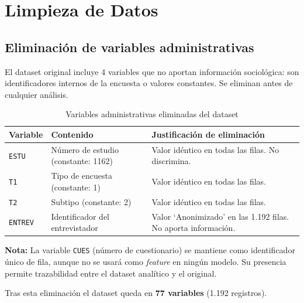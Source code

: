 \documentclass[12pt,a4paper]{article}
\newcommand{\thead}[1]{\cellcolor{tableheader}\color{white}\textbf{#1}}
\begin{document}
\newpage

\section{Limpieza de Datos}

\subsection{Eliminación de variables administrativas}

El dataset original incluye 4 variables que no aportan información sociológica: son identificadores internos de la encuesta o valores constantes. Se eliminan antes de cualquier análisis.

\begin{table}[H]
\centering
\renewcommand{\arraystretch}{1.4}
\begin{tabularx}{\linewidth}{p{2cm} p{3.5cm} X}
\toprule
\thead{Variable} & \thead{Contenido} & \thead{Justificación de eliminación} \\
\midrule
\texttt{ESTU}   & Número de estudio (constante: 1162)   & Valor idéntico en todas las filas. No discrimina. \\
\rowcolor{tablerow}
\texttt{T1}     & Tipo de encuesta (constante: 1)        & Valor idéntico en todas las filas. \\
\texttt{T2}     & Subtipo (constante: 2)                 & Valor idéntico en todas las filas. \\
\rowcolor{tablerow}
\texttt{ENTREV} & Identificador del entrevistador        & Valor `Anonimizado' en las 1.192 filas. No aporta información. \\
\bottomrule
\end{tabularx}
\caption{Variables administrativas eliminadas del dataset}
\end{table}

\begin{notebox}
\textbf{Nota:} La variable \texttt{CUES} (número de cuestionario) se mantiene como identificador único de fila, aunque no se usará como \textit{feature} en ningún modelo. Su presencia permite trazabilidad entre el dataset analítico y el original.
\end{notebox}

\vspace{0.5em}

Tras esta eliminación el dataset queda en \textbf{77 variables} (1.192 registros).
\end{document}
